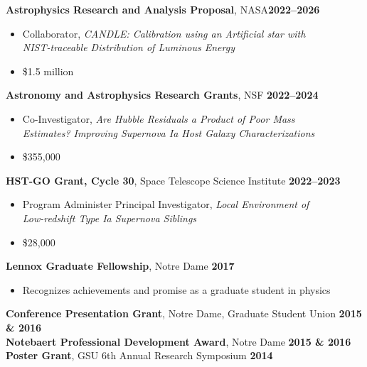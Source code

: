 \documentclass[margin]{res}
\begin{document}
\begin{resume}
\textbf{Astrophysics Research and Analysis Proposal}, NASA\hfill {\bf 2022--2026}
\begin{itemize}  \itemsep -2pt %
     \item[] Collaborator, \textit{CANDLE: Calibration using an Artificial star with\\NIST-traceable Distribution of Luminous Energy}
     \item[] \$1.5 million
    \end{itemize} \vspace{-12pt}
\textbf{Astronomy and Astrophysics Research Grants}, NSF \hfill \textbf{2022--2024}
\begin{itemize}  \itemsep -2pt %
     \item[] Co-Investigator, \textit{Are Hubble Residuals a Product of Poor Mass\\Estimates? Improving Supernova Ia Host Galaxy Characterizations} 
     \item[] \$355,000
    \end{itemize} \vspace{-12pt}
\textbf{HST-GO Grant, Cycle 30}, Space Telescope Science Institute \hfill \textbf{2022--2023}
\begin{itemize}  \itemsep -2pt %
     \item[] Program Administer Principal Investigator, \textit{Local Environment of\\Low-redshift Type Ia Supernova Siblings} 
     \item[] \$28,000
    \end{itemize} \vspace{-12pt}
{\bf Lennox Graduate Fellowship}, Notre Dame \hfill {\bf 2017}
    \begin{itemize}  \itemsep -2pt %
     \item[] Recognizes achievements and promise as a graduate student in physics
    \end{itemize} \vspace{-12pt}
{\bf Conference Presentation Grant}, Notre Dame, Graduate Student Union  \hfill {\bf 2015 \& 2016}\\
{\bf Notebaert Professional Development Award}, Notre Dame \hfill {\bf 2015 \& 2016}\\
{\bf Poster Grant}, GSU 6th Annual Research Symposium \hfill {\bf 2014}

\end{resume}
\end{document}
